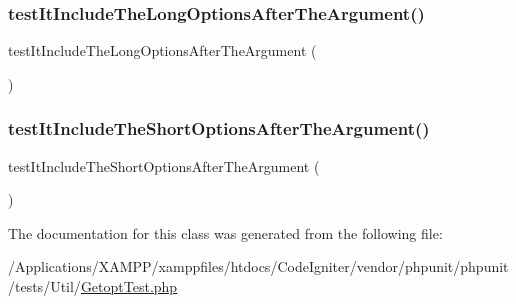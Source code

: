 \subsubsection{\texorpdfstring{test\+It\+Include\+The\+Long\+Options\+After\+The\+Argument()}{testItIncludeTheLongOptionsAfterTheArgument()}}
{\footnotesize\ttfamily test\+It\+Include\+The\+Long\+Options\+After\+The\+Argument (\begin{DoxyParamCaption}{ }\end{DoxyParamCaption})}

\mbox{\label{class_util___getopt_test_a4a9b5c6ef079722a8d6e6d9f22719749}} 
\subsubsection{\texorpdfstring{test\+It\+Include\+The\+Short\+Options\+After\+The\+Argument()}{testItIncludeTheShortOptionsAfterTheArgument()}}
{\footnotesize\ttfamily test\+It\+Include\+The\+Short\+Options\+After\+The\+Argument (\begin{DoxyParamCaption}{ }\end{DoxyParamCaption})}



The documentation for this class was generated from the following file\+:\begin{DoxyCompactItemize}
\item 
/\+Applications/\+X\+A\+M\+P\+P/xamppfiles/htdocs/\+Code\+Igniter/vendor/phpunit/phpunit/tests/\+Util/\mbox{\hyperlink{_getopt_test_8php}{Getopt\+Test.\+php}}\end{DoxyCompactItemize}
